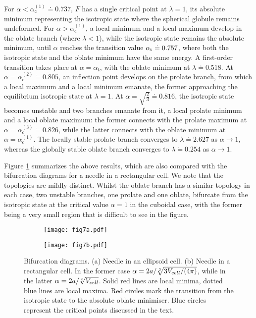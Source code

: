 \documentclass{article}
\begin{document}
For $\alpha <\alpha _{\mathrm{c}}^{(1)}\doteq 0.737$, $F$ has a single
critical point at $\lambda =1$, its absolute minimum representing the
isotropic state where the spherical globule remains undeformed. For $\alpha
>\alpha _{\mathrm{c}}^{(1)}$, a local minimum and a local maximum develop in
the oblate branch (where $\lambda <1$), while the isotropic state remains
the absolute minimum, until $\alpha $ reaches the transition value $\alpha _{%
\mathrm{t}}\doteq 0.757$, where both the isotropic state and the oblate
minimum have the same energy. A first-order transition takes place at $%
\alpha =\alpha _{\mathrm{t}}$, with the oblate minimum at $\lambda \doteq
0.518$. At $\alpha =\alpha _{c}^{(2)}\dot{=}0.805$, an inflection point
develops on the prolate branch, from which a local maximum and a local
minimum emanate, the former approaching the equilibrium isotropic state at $%
\lambda =1$. At $\alpha =\sqrt{\frac{2}{3}}\doteq 0.816$, the isotropic
state becomes unstable and two branches emanate from it, a local prolate
minimum and a local oblate maximum: the former connects with the prolate
maximum at $\alpha =\alpha _{c}^{(3)}\dot{=}0.826$, while the latter
connects with the oblate minimum at $\alpha =\alpha _{c}^{(1)}$. The locally
stable prolate branch converges to $\lambda \doteq 2.627$ as $\alpha
\rightarrow 1$, whereas the globally stable oblate branch converges to $%
\lambda \dot{=} 0.254$ as $\alpha\to 1$.

Figure \ref{fig:bifurcation} summarizes the above results, which are also
compared with the bifurcation diagrams for a needle in a rectangular cell.
We note that the topologies are mildly distinct. Whilst the oblate branch has a similar topology in each case, two unstable branches, one prolate and one oblate, bifurcate from the isotropic state at the critical value $\alpha=1$ in the cuboidal case, with the former being a very small region that is difficult to see in the figure. 

\begin{figure}[h]
\centering
\begin{subfigure}[c]{0.4\linewidth}
\texttt{[image: fig7a.pdf]}
\caption{}
\end{subfigure} 
\qquad
\begin{subfigure}[c]{0.4\linewidth}
\texttt{[image: fig7b.pdf]}\caption{}
\end{subfigure}
\caption{Bifurcation diagrams. (a) Needle in an ellipsoid cell. (b) Needle
in a rectangular cell. In the former case $\protect\alpha = 2a/\sqrt[3]{%
3V_{cell}/(4\protect\pi)}$, while in the latter $\protect\alpha=2a/\sqrt[3]{%
V_{cell}}$. Solid red lines are local minima, dotted blue lines are local
maxima. Red circles mark the transition from the isotropic state to the
absolute oblate minimiser. Blue circles represent the critical points
discussed in the text.}
\label{fig:bifurcation}
\end{figure}
\end{document}
